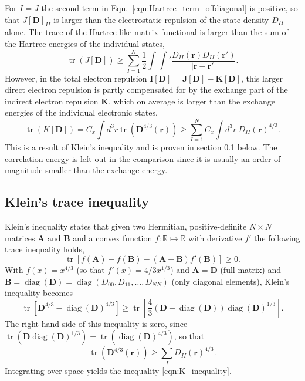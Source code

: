 \documentclass[journal=jacsat,manuscript=article]{achemso}
\DeclareMathOperator{\tr}{tr}
\DeclareMathOperator{\Diag}{diag}
\newcommand\m[1]{\mathbf{#1}}
\renewcommand\vec[1]{\mathbf{#1}}
\begin{document}
For $I=J$ the second term in Eqn.~\ref{eqn:Hartree_term_offdiagonal} is positive, so that
$J[\m{D}]_{II}$ is larger than the electrostatic repulsion of the state density $D_{II}$ alone. The trace of the Hartree-like
matrix functional is larger than the sum of the Hartree energies of the individual states,
\begin{equation}
 \tr(J[\m{D}]) \ge \sum_{I=1}^{N} \frac{1}{2} \int \int' \frac{D_{II}(\vec{r}) D_{II}(\vec{r}')}{\vert \vec{r} - \vec{r}' \vert}. \label{eqn:J_inequality}
\end{equation}
However, in the total electron repulsion $\m{I}[\m{D}] = \m{J}[\m{D}] - \m{K}[\m{D}]$,
this larger direct electron repulsion is partly compensated for by the
exchange part of the indirect electron repulsion $\m{K}$, which on average is larger than the
exchange energies of the individual electronic states,
\begin{equation}
 \tr(K[\m{D}]) = C_x \int d^3r \tr(\m{D}^{4/3}(\vec{r})) \ge \sum_{I=1}^N C_x \int d^3r ~ D_{II}(\vec{r})^{4/3}. \label{eqn:K_inequality}
\end{equation}
This is a result of Klein's inequality \cite{wiki:Kleins_inequality} and is proven in section \ref{sec:Kleins_inequality} below.
The correlation energy is left out in the comparison since it is usually an order of magnitude smaller than the exchange energy.

\subsection{Klein's trace inequality}
\label{sec:Kleins_inequality}
Klein's inequality \cite{wiki:Kleins_inequality} \cite{Ruelle1969statistical} states that given two Hermitian, positive-definite $N \times N$ matrices $\m{A}$ and $\m{B}$ and
a convex function $f: \mathbb{R} \mapsto \mathbb{R}$ with derivative $f'$ the following trace inequality holds,
\begin{equation}
\tr\left[ f(\m{A}) - f(\m{B}) - (\m{A} - \m{B}) f'(\m{B}) \right] \ge 0 \label{eqn:Kleins_inequality}.
\end{equation}
With $f(x) = x^{4/3}$ (so that $f'(x) = 4/3 x^{1/3}$) and $\m{A} = \m{D}$ (full matrix) and $\m{B} = \Diag(\m{D}) = \Diag(D_{00}, D_{11}, \ldots, D_{NN})$ (only diagonal elements),
Klein's inequality becomes
\begin{equation}
\tr\left[ \m{D}^{4/3} - \Diag(\m{D})^{4/3} \right] \ge \tr\left[ \frac{4}{3} \left(\m{D} - \Diag(\m{D})\right) \Diag(\m{D})^{1/3}\right].
\end{equation}
The right hand side of this inequality is zero, since $\tr(\m{D} \Diag(\m{D})^{1/3}) = \tr(\Diag(\m{D})^{4/3})$, so that 
\begin{equation}
\tr(\m{D}^{4/3}(\vec{r})) \ge \sum_I D_{II}(\vec{r})^{4/3}.
\end{equation}
Integrating over space yields the inequality \ref{eqn:K_inequality}.
\end{document}
